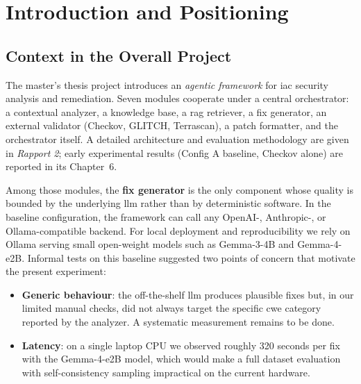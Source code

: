 \documentclass[12pt, a4paper]{report}
\begin{document}
\tableofcontents
\listoffigures
\listoftables

\printglossary[type=\acronymtype, title=List of Acronyms]

\chapter{Introduction and Positioning}

\section{Context in the Overall Project}

The master's thesis project introduces an \emph{agentic framework} for
\gls{iac} security analysis and remediation. Seven modules cooperate under
a central orchestrator: a contextual analyzer, a knowledge base, a
\gls{rag} retriever, a fix generator, an external validator (Checkov,
GLITCH, Terrascan), a patch formatter, and the orchestrator itself. A
detailed architecture and evaluation methodology are given in
\emph{Rapport 2}; early experimental results (Config A baseline, Checkov
alone) are reported in its Chapter~6.

Among those modules, the \textbf{fix generator} is the only component whose
quality is bounded by the underlying \gls{llm} rather than by deterministic
software. In the baseline configuration, the framework can call any
OpenAI-, Anthropic-, or Ollama-compatible backend. For local deployment and
reproducibility we rely on Ollama serving small open-weight models such as
Gemma-3-4B and Gemma-4-e2B. Informal tests on this baseline suggested two
points of concern that motivate the present experiment:

\begin{itemize}
  \item \textbf{Generic behaviour}: the off-the-shelf \gls{llm} produces
  plausible fixes but, in our limited manual checks, did not always target
  the specific \gls{cwe} category reported by the analyzer. A systematic
  measurement remains to be done.
  \item \textbf{Latency}: on a single laptop CPU we observed roughly 320
  seconds per fix with the Gemma-4-e2B model, which would make a full
  dataset evaluation with self-consistency sampling impractical on the
  current hardware.
\end{itemize}
\end{document}
